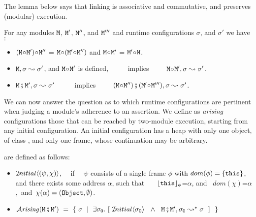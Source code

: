 The lemma below says  that linking is associative and commutative, and preserves (modular) execution.

\begin{lemma}
 For any modules $\M$,   $\M'$, $\M''$, and $\M'''$ and runtime configurations $\sigma$, and $\sigma'$ we have$:$
 \label{lemma:linking:properties}

 \begin{itemize}
     \item
     $(\M \link \M')\link \M''$ = $\M \link (\M' \link \M'')$  \hspace{1cm} and    \hspace{1cm}   $\M \link \M'$  = $\M' \link\M$.
      \item
      $\M, \sigma \leadsto \sigma'$, and $\M\link \M'$ is defined, \  \ \ \ \  implies\ \ \ \ \   $\M\link \M', \sigma \leadsto \sigma'$.
 \item
 $\M \mkpair \M', \sigma \leadsto \sigma'$   \  \ \ \ \  implies\ \ \ \ \  $(\M\link\M'') \mkpair (\M'\link\M''') ,\sigma \leadsto \sigma'$.  
  \end{itemize}

 \end{lemma}
 
 We can now answer the question as to which runtime configurations are pertinent when judging a module's
adherence to an assertion.
We define as  {\em arising} configurations those that can be reached by two-module execution, starting from any initial configuration.
An initial configuration has a heap with only one object, of class , and only one frame, whose continuation may be arbitrary.
 
\begin{definition} are defined as follows: \label{defn:iniial-and-arising}

\begin{itemize}
     \item
   $\Initial {(\psi,\chi)}$, \ \ if \ \ $\psi$ consists of a single frame $\phi$ with $dom(\phi)=\{ \this \}$, and there exists  some address $\alpha$, such that \ \ \    $\interp {\this}{\phi}$=$\alpha$, and \ $dom(\chi)$=$\alpha$,\  and\  
    $\chi(\alpha)=(\prg{Object},\emptyset)$.
 \item
 $\Arising  {\M\mkpair\M'} \ = \ \{ \ \sigma \ \mid \ \exists \sigma_0. \ [\  \Initial{\sigma_0} \  \ \wedge\ \  \M\mkpair\M', \sigma_0 \leadsto^* \sigma \ \ ] \ \ \} $
 \end{itemize}

\end{definition}
